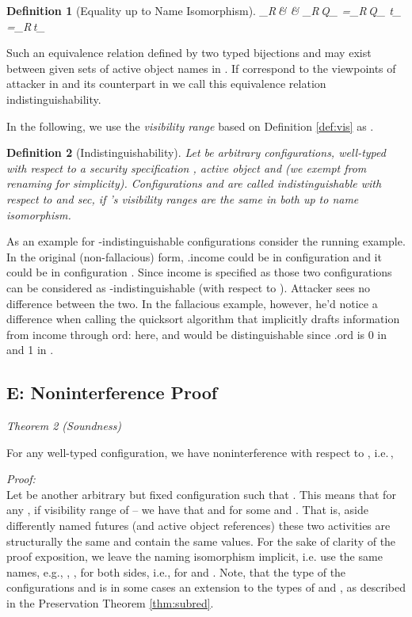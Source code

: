 \documentclass[10pt, conference, compsocconf]{IEEEtran}
\newcommand{\symb}[1]{\makebox{\it #1}}
\newcommand\indR{{=}_{R}\,}
\newcommand\ie{i.e.\!\,, }
\newtheorem{definition}{Definition}[section]
\begin{document}
{\begin{definition}[Equality up to Name Isomorphism]
\alpha[Q_{\alpha}, t_{\beta}] \indR {} & \equiv & \alpha \indR \beta \wedge Q_{\alpha} \indR Q_{\beta} \wedge t_{\alpha} \indR t_{\beta} \
\end{definition}
Such an equivalence relation defined by two typed bijections  and  may exist
between given sets  of active object names in . If  correspond to the viewpoints
of attacker  in  and its counterpart in  we call this equivalence relation 
indistinguishability.


In the following, we use the {\it visibility range} based on Definition \ref{def:vis} as
.
\begin{definition}[Indistinguishability]
Let  be arbitrary configurations, well-typed with respect to a security specification \symb{sec}, 
active object  and  (we exempt  from renaming 
for simplicity).
Configurations  and  are called indistinguishable with respect to  and {\it sec}, 
if 's visibility ranges are the same in both up to name isomorphism.

\end{definition}

As an example for -indistinguishable configurations consider the running example.
In the original (non-fallacious) form, .income could be  in configuration 
and it could be  in configuration . Since income is specified as  those two configurations
can be considered as -indistinguishable (with respect to ). 
Attacker  sees no difference between the two. In the fallacious example, however, he'd notice a difference
when calling the quicksort algorithm that implicitly drafts information from income through ord:
here,  and  would be distinguishable since .ord is 0 in  and 1 in .



\subsection*{E: Noninterference Proof}
\it Theorem 2 (Soundness)}
For any well-typed configuration, 
we have noninterference with respect to , \ie

{\it Proof:}\\
Let  be another arbitrary but fixed configuration such that .
This means that for any , if  visibility range of  -- 
we have that  and  for some  and . 
That is, aside differently named  futures (and active object references) these two activities are structurally 
the same and contain the same values.
For the sake of clarity of the proof exposition, we leave the naming isomorphism
implicit, i.e. use the same names, e.g., , , for both sides, i.e., 
for  and .
Note, that
the type of the configurations  and  is in some cases an extension to the types of  and , 
as described in the Preservation Theorem \ref{thm:subred}.
\end{document}
